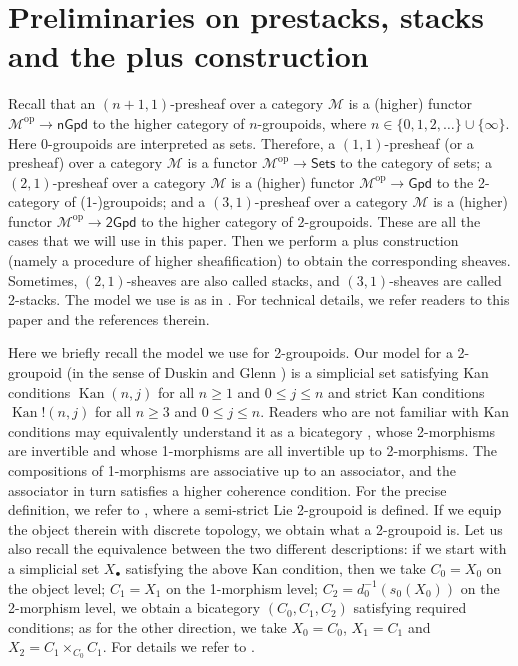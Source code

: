 \documentclass[letterpaper,10pt, oneside]{article} %
\newcommand{\Cat}{\mathcal M}%
\newcommand{\Sets}{\mathsf{Sets}}%
\newcommand{\Gpd}{\mathsf{Gpd}}%
\newcommand{\nGpd}{\mathsf{nGpd}}%
\newcommand{\tGpd}{\mathsf{2Gpd}}%
\DeclareMathOperator{\Kan}{Kan}     %
\newcommand{\op}{\mathrm{op}}%
\begin{document}
\section{Preliminaries on prestacks, stacks and the plus construction}

Recall that an $(n+1,1)$-presheaf  over a category $\Cat$ is a (higher) functor
$\Cat^{\op} \to \nGpd$ to the higher category of $n$-groupoids, where $n \in
\{0, 1, 2, \dots\} \cup \{\infty\}$. Here $0$-groupoids are
interpreted as sets. Therefore, a $(1, 1)$-presheaf (or a
 presheaf) over a category $\Cat$  is a functor $\Cat^{\op} \to \Sets$
to the category of sets;  a $(2, 1)$-presheaf over a
category $\Cat$ is a (higher) functor $\Cat^{\op} \to \Gpd$ to the 2-category of
(1-)groupoids;  and a $(3, 1)$-presheaf over a category $\Cat$ is a (higher)
functor $\Cat^{\op} \to \tGpd$ to the higher category of $2$-groupoids. These are
all the cases that we will use in this paper. Then
we perform a plus construction
(namely a procedure of higher sheafification) to obtain the corresponding
sheaves. Sometimes, $(2, 1)$-sheaves are also called stacks, and $(3,1)$-sheaves
are called 2-stacks. The model we use is as in
\cite[Section 2]{nikolaus-schweigert}. For technical details, we refer
readers to this paper and the references therein.


Here we briefly recall the model we use for 2-groupoids. Our model
for a
2-groupoid (in the sense of Duskin and Glenn \cite{duskin, glenn}) is a simplicial set satisfying Kan conditions $\Kan(n, j)$
for all $n\ge 1$ and $0\le j \le n$ and strict
Kan conditions $\Kan!(n, j)$ for all $n\ge 3$ and $0\le j \le n$. Readers who are not familiar with Kan conditions may equivalently
understand it as a bicategory \cite{ben}, whose 2-morphisms are
invertible and whose 1-morphisms are all invertible up to
2-morphisms. The compositions of 1-morphisms are associative up to an
associator, and the associator in turn satisfies a higher coherence
condition. For the precise definition, we refer to \cite[Definition
5.2]{sheng-zhu3}, where a semi-strict Lie 2-groupoid is defined. If we
equip the object therein with discrete topology, we obtain what a
2-groupoid is. Let us also recall the equivalence between the two
different descriptions: if we start with a simplicial set $X_\bullet$
satisfying the above Kan condition, then we take $C_0=X_0$ on the
object level; $C_1=X_1$ on the 1-morphism level; $C_2= d_0^{-1} (
s_0(X_0))$ on the 2-morphism level, we obtain a bicategory $(C_0, C_1,
C_2)$ satisfying
required conditions; as for the other direction, we take $X_0=C_0$,
$X_1=C_1$ and $X_2= C_1\times_{C_0}C_1$.  For details we refer to
\cite[Section 4]{z:tgpd}.
\end{document}

